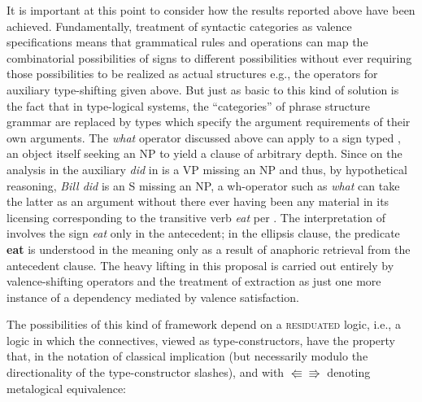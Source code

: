 \documentclass[output=paper,colorlinks,citecolor=brown]{langscibook}
\begin{document}
It is important at this point to consider how the results reported
above have been achieved. Fundamentally, treatment of syntactic
categories as valence specifications means that grammatical
rules and operations can map the combinatorial possibilities of signs
to different possibilities without ever requiring those possibilities
to be realized as actual structures e.g., the operators for auxiliary
type-shifting given above. But just as basic to this kind of solution
is the fact that in type-logical systems, the ``categories'' of phrase
structure grammar are replaced by types which specify the argument
requirements of their own arguments. The \textit{what} operator discussed
above can apply to a sign typed , an object itself seeking an NP
to yield a clause of arbitrary depth. Since on the analysis in
 the auxiliary \textit{did} in  is a VP
missing an NP and thus, by hypothetical reasoning, \textit{Bill did} is an S
missing an NP, a wh-operator such as \textit{what} can take the latter as
an argument without there ever having been any material in its
licensing corresponding to the transitive verb \textit{eat} per
. The interpretation of  involves
the sign \textit{eat} only in the antecedent; in the ellipsis clause, the
predicate \textbf{eat} is understood in the meaning only as a result of
anaphoric retrieval from the antecedent clause. The heavy lifting in
this proposal is carried out entirely by valence-shifting operators
and the treatment of extraction as just one more instance of a
dependency mediated by valence satisfaction.

The possibilities of this kind of framework depend on a \textsc{residuated}
logic, i.e., a logic in which the connectives, viewed as
type-constructors, have the property that, in the notation of
classical implication (but necessarily modulo the directionality of the
type-constructor slashes), and with $\Lleftarrow\!\Rrightarrow$
denoting metalogical equivalence:
\end{document}
